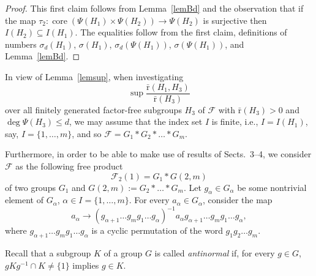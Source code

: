 \documentclass[10pt, reqno]{amsart}
\numberwithin{equation}{section}
\begin{document}
\begin{proof}  This first claim follows from Lemma~\ref{lemBd} and the observation that
if the map  $\tau_2 :  \operatorname{core} (\Psi(H_1) \times \Psi(H_2)) \to  \Psi(H_2)$ is surjective  then $I(H_2) \subseteq I(H_1)$. The equalities follow from the first claim, definitions of numbers  $\sigma_d(H_1)$, $\sigma(H_1)$,
 $\sigma_d(\Psi(H_1))$, $\sigma(\Psi(H_1))$,  and  Lemma~\ref{lemBd}.
\end{proof}

In view of  Lemma~\ref{lemsup}, when investigating
 $$\sup \frac{ {\bar {\mathrm{r}}}(   H_1, H_3  )  }{  {\bar {\mathrm{r}}}(H_3 ) }$$
over all finitely generated factor-free subgroups $H_3$ of  ${\mathcal{F}}$ with
${\bar {\mathrm{r}}}(H_3 ) >0$  and $\deg \Psi(H_3)  \le d$,  we may assume that the index set $I$
is finite, i.e., $I= I(H_1)$,  say, $I = \{ 1, \dots, m\}$,
and so  ${\mathcal{F}}= G_1  *  G_2  * \ldots * G_{m}$.

Furthermore, in order to be able to make use of results of Sects.~3--4,
we consider ${\mathcal{F}}$ as the following  free product
$$
{\mathcal{F}}_2(1) =   G_1 *  G(2, m)
$$
of two groups $G_1$ and  $G(2, m) := G_2  * \ldots * G_{m}$. Let $g_{\alpha} \in G_{\alpha}$ be some nontrivial element of  $G_{\alpha}$, ${\alpha} \in I = \{ 1, \dots, m \}$. For every  $a_{\alpha} \in G_{\alpha}$,  consider the map
\begin{equation}\label{map2}
a_{\alpha} \to
  (g_{{\alpha}+1} \ldots  g_{m}  g_{1} \ldots  g_{\alpha})^{-1}  a_{\alpha}   g_{{\alpha} +1} \ldots  g_{m}  g_{1} \ldots   g_{\alpha}   ,
\end{equation}
where $g_{{\alpha}+1 }  \ldots   g_{m}  g_{1} \ldots  g_{\alpha}$ is a cyclic permutation of the
word $g_{1}  g_{2}  \ldots g_{m}$.

Recall that a subgroup $K$ of a group $G$ is called {\em antinormal}
if, for every $g \in G$, $g K g^{-1} \cap K \ne \{ 1\}$ implies $g \in K$.
\end{document}
